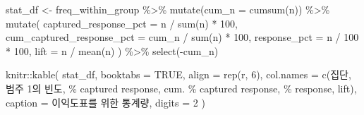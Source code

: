 \documentclass[
]{book}
\newenvironment{Shaded}{\begin{snugshade}}{\end{snugshade}}
\newcommand{\AttributeTok}[1]{\textcolor[rgb]{0.77,0.63,0.00}{#1}}
\newcommand{\ConstantTok}[1]{\textcolor[rgb]{0.00,0.00,0.00}{#1}}
\newcommand{\DecValTok}[1]{\textcolor[rgb]{0.00,0.00,0.81}{#1}}
\newcommand{\FunctionTok}[1]{\textcolor[rgb]{0.00,0.00,0.00}{#1}}
\newcommand{\NormalTok}[1]{#1}
\newcommand{\OtherTok}[1]{\textcolor[rgb]{0.56,0.35,0.01}{#1}}
\newcommand{\SpecialCharTok}[1]{\textcolor[rgb]{0.00,0.00,0.00}{#1}}
\newcommand{\StringTok}[1]{\textcolor[rgb]{0.31,0.60,0.02}{#1}}
\begin{document}
\begin{Shaded}
\begin{Highlighting}[]
\NormalTok{stat\_df }\OtherTok{\textless{}{-}}\NormalTok{ freq\_within\_group }\SpecialCharTok{\%\textgreater{}\%}
  \FunctionTok{mutate}\NormalTok{(}\AttributeTok{cum\_n =} \FunctionTok{cumsum}\NormalTok{(n)) }\SpecialCharTok{\%\textgreater{}\%}
  \FunctionTok{mutate}\NormalTok{(}
    \AttributeTok{captured\_response\_pct =}\NormalTok{ n }\SpecialCharTok{/} \FunctionTok{sum}\NormalTok{(n) }\SpecialCharTok{*} \DecValTok{100}\NormalTok{,}
    \AttributeTok{cum\_captured\_response\_pct =}\NormalTok{ cum\_n }\SpecialCharTok{/} \FunctionTok{sum}\NormalTok{(n) }\SpecialCharTok{*} \DecValTok{100}\NormalTok{,}
    \AttributeTok{response\_pct =}\NormalTok{ n }\SpecialCharTok{/} \DecValTok{100} \SpecialCharTok{*} \DecValTok{100}\NormalTok{,}
    \AttributeTok{lift =}\NormalTok{ n }\SpecialCharTok{/} \FunctionTok{mean}\NormalTok{(n)}
\NormalTok{  ) }\SpecialCharTok{\%\textgreater{}\%}
  \FunctionTok{select}\NormalTok{(}\SpecialCharTok{{-}}\NormalTok{cum\_n)}

\NormalTok{knitr}\SpecialCharTok{::}\FunctionTok{kable}\NormalTok{(}
\NormalTok{  stat\_df,}
  \AttributeTok{booktabs =} \ConstantTok{TRUE}\NormalTok{,}
  \AttributeTok{align =} \FunctionTok{rep}\NormalTok{(}\StringTok{\textquotesingle{}r\textquotesingle{}}\NormalTok{, }\DecValTok{6}\NormalTok{),}
  \AttributeTok{col.names =} \FunctionTok{c}\NormalTok{(}\StringTok{\textquotesingle{}집단\textquotesingle{}}\NormalTok{, }\StringTok{\textquotesingle{}범주 1의 빈도\textquotesingle{}}\NormalTok{, }\StringTok{\textquotesingle{}\% captured response\textquotesingle{}}\NormalTok{, }
                \StringTok{\textquotesingle{}cum. \% captured response\textquotesingle{}}\NormalTok{, }\StringTok{\textquotesingle{}\% response\textquotesingle{}}\NormalTok{, }\StringTok{\textquotesingle{}lift\textquotesingle{}}\NormalTok{),}
  \AttributeTok{caption =} \StringTok{\textquotesingle{}이익도표를 위한 통계량\textquotesingle{}}\NormalTok{,}
  \AttributeTok{digits =} \DecValTok{2}
\NormalTok{)}
\end{Highlighting}
\end{Shaded}
\end{document}
